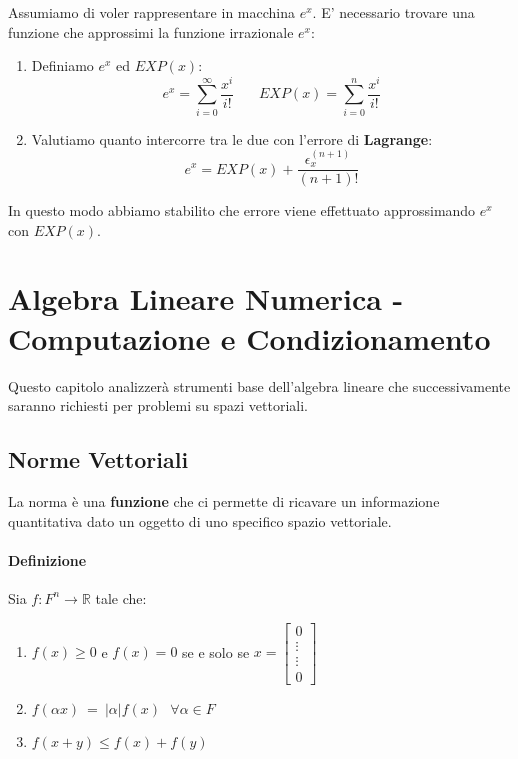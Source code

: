 \documentclass{article}
\begin{document}
Assumiamo di voler rappresentare in macchina $e^x$. E' necessario trovare una funzione che approssimi la funzione irrazionale $e^x$:

\begin{enumerate}
    \item Definiamo $e^x$ ed $EXP(x)$:
    \[ \boxed{e^{x} = \sum^{\infty}_{i=0} \frac{x^{i}}{i!}} \: \: \: \: \: \: \: \: \boxed{EXP(x) = \sum^{n}_{i=0} \frac{x^{i}}{i!}} \]
    \item Valutiamo quanto intercorre tra le due con l'errore di \textbf{Lagrange}:
    \[ e^x = EXP(x) + \frac{\epsilon^{(n+1)}_{x}}{(n+1)!} \]
\end{enumerate}

In questo modo abbiamo stabilito che errore viene effettuato approssimando $e^x$ con $EXP(x)$.

\newpage

\section{Algebra Lineare Numerica - Computazione e Condizionamento}

Questo capitolo analizzerà strumenti base dell'algebra lineare che successivamente saranno richiesti per problemi su spazi vettoriali.

\subsection{Norme Vettoriali}

La norma è una \textbf{funzione} che ci permette di ricavare un informazione quantitativa dato un oggetto di uno specifico spazio vettoriale.

\paragraph{Definizione} Sia $f: F^{n} \xrightarrow{} \mathbb{R}$ tale che:

\begin{enumerate}
    \item $f(x) \geq 0 $ e $f(x) = 0$ se e solo se $x = \begin{bmatrix}
0 \\
\vdots \\
\vdots \\
0
\end{bmatrix}$

    \item $f(\alpha x) \: = \: |\alpha|f(x) \: \: \: \forall \alpha \in F $
    \item $f(x+y) \leq f(x) + f(y)$
\end{enumerate}
\end{document}

